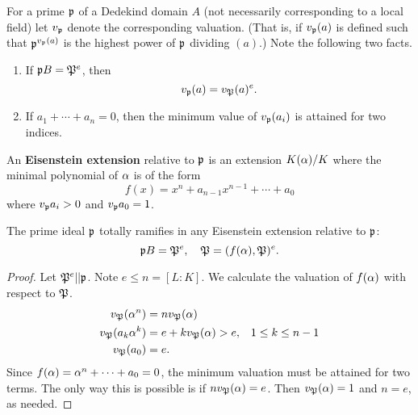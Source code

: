 For a prime $\mathfrak{p}$ of a Dedekind domain $A$ (not necessarily corresponding to a local field) let $v_{\mathfrak{p}}$ denote the corresponding valuation. (That is, if $v_{\mathfrak{p}}(a)$ is defined such that $\mathfrak{p}^{v_{\mathfrak{p}}(a)}$ is the highest power of $\mathfrak{p}$ dividing $(a)$.) 
Note the following two facts.
\begin{enumerate}
\item If $\mathfrak{p} B=\mathfrak{P}^e$, then
\[
v_{\mathfrak{p}}(a)=v_{\mathfrak{P}}(a)^e.
\]
\item If $a_1+\cdots +a_n=0$, then the minimum value of $v_{\mathfrak{p}}(a_i)$ is attained for two indices.
\end{enumerate}
\begin{df}
An \textbf{Eisenstein extension} relative to $\mathfrak{p}$ is an extension $K(\alpha)/K$ where the minimal polynomial of $\alpha$ is of the form
\[
f(x)=x^n+a_{n-1}x^{n-1}+\cdots +a_0
\]
where $v_{\mathfrak{p}} a_i>0$ and $v_{\mathfrak{p}} a_0=1$.
\end{df}
\begin{thm}
The prime ideal $\mathfrak{p}$ totally ramifies in any Eisenstein extension relative to $\mathfrak{p}$:
\[
\mathfrak{p} B=\mathfrak{P}^e, \quad \mathfrak{P}=(f(\alpha), \mathfrak{P})^e.
\]
\end{thm}
\begin{proof}
Let $\mathfrak{P}^e|| \mathfrak{p}$. Note $e\le n=[L:K]$.
We calculate the valuation of $f(\alpha)$ with respect to $\mathfrak{P}$.
\begin{align*}
v_{\mathfrak{P}}(\alpha^n)&= nv_{\mathfrak{P}}(\alpha)\\
v_{\mathfrak{P}}(a_k\alpha^k)&= e+kv_{\mathfrak{P}}(\alpha)>e,&1\le k\le n-1\\
v_{\mathfrak{P}}(a_0)&=e.
\end{align*}
Since $f(\alpha)=\alpha^n+\cdots +a_0=0$, the minimum valuation must be attained for two terms. The only way this is possible is if $nv_{\mathfrak{P}}(\alpha)=e$. Then  $v_{\mathfrak{P}}(\alpha)=1$ and $n=e$, as needed.
\end{proof}

